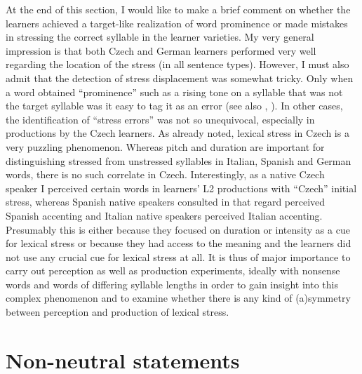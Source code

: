 At the end of this section, I would like to make a brief comment on whether the learners achieved a target-like realization of word prominence or made mistakes in stressing the correct syllable in the learner varieties. My very general impression is that both Czech and German learners performed very well regarding the location of the stress (in all sentence types). However, I must also admit that the detection of stress displacement was somewhat tricky. Only when a word obtained “prominence” such as a rising tone on a syllable that was not the target syllable was it easy to tag it as an error (see also , ). In other cases, the identification of “stress errors” was not so unequivocal, especially in productions by the Czech learners. As already noted, lexical stress in Czech is a very puzzling phenomenon. Whereas pitch and duration are important for distinguishing stressed from unstressed syllables in Italian, Spanish and German words, there is no such correlate in Czech. Interestingly, as a native Czech speaker I perceived certain words in learners’ L2 productions with “Czech” initial stress, whereas Spanish native speakers consulted in that regard perceived Spanish accenting and Italian native speakers perceived Italian accenting. Presumably this is either because they focused on duration or intensity as a cue for lexical stress or because they had access to the meaning and the learners did not use any crucial cue for lexical stress at all. It is thus of major importance to carry out perception as well as production experiments, ideally with nonsense words and words of differing syllable lengths in order to gain insight into this complex phenomenon and to examine whether there is any kind of (a)symmetry between perception and production of lexical stress.

\section{Non-neutral statements}\label{sec:4.2}
